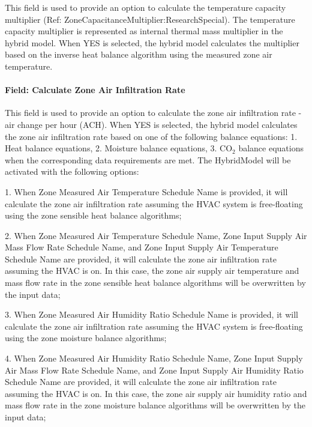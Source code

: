 This field is used to provide an option to calculate the temperature capacity multiplier (Ref: ZoneCapacitanceMultiplier:ResearchSpecial). The temperature capacity multiplier is represented as internal thermal mass multiplier in the hybrid model.
When YES is selected, the hybrid model calculates the multiplier based on the inverse heat balance algorithm using the measured zone air temperature.

\paragraph{Field: Calculate Zone Air Infiltration Rate}\label{field-calculate-zone-air-infiltration-rate-hm}

This field is used to provide an option to calculate the zone air infiltration rate - air change per hour (ACH).
When YES is selected, the hybrid model calculates the zone air infiltration rate based on one of the following balance equations: 1. Heat balance equations, 2. Moisture balance equations, 3. CO$_2$ balance equations when the corresponding data requirements are met. The HybridModel will be activated with the following options:

1. When Zone Measured Air Temperature Schedule Name is provided, it will calculate the zone air infiltration rate assuming the HVAC system is free-floating using the zone sensible heat balance algorithms;

2. When Zone Measured Air Temperature Schedule Name, Zone Input Supply Air Mass Flow Rate Schedule Name, and Zone Input Supply Air Temperature Schedule Name are provided, it will calculate the zone air infiltration rate assuming the HVAC is on. In this case, the zone air supply air temperature and mass flow rate in the zone sensible heat balance algorithms will be overwritten by the input data;

3. When Zone Measured Air Humidity Ratio Schedule Name is provided, it will calculate the zone air infiltration rate assuming the HVAC system is free-floating using the zone moisture balance algorithms;

4. When Zone Measured Air Humidity Ratio Schedule Name, Zone Input Supply Air Mass Flow Rate Schedule Name, and Zone Input Supply Air Humidity Ratio Schedule Name are provided, it will calculate the zone air infiltration rate assuming the HVAC is on. In this case, the zone air supply air humidity ratio and mass flow rate in the zone moisture balance algorithms will be overwritten by the input data;

